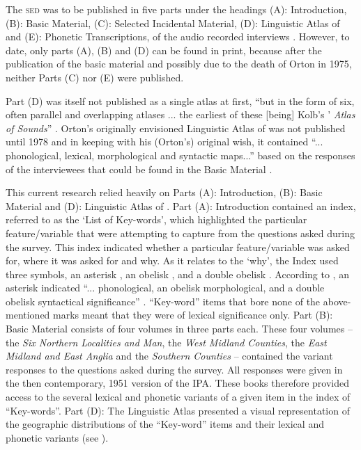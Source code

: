 The \textsc{sed} was to be published in five parts under the headings (A): Introduction, (B): Basic Material, (C): Selected Incidental Material, (D): Linguistic Atlas of  and (E): Phonetic Transcriptions, of the audio recorded interviews \citep{Orton62}. However, to date, only parts (A), (B) and (D) can be found in print, because after the publication of the basic material and possibly due to the death of Orton in 1975, neither Parts (C) nor (E) were published.

Part (D) was itself not published as a single atlas at first, ``but in the form of six, often parallel and overlapping atlases ... the earliest of these [being] Kolb's \citep{Kolb79}'  \emph{Atlas of  Sounds}'' \citep[12]{Fischer91}. Orton's originally envisioned Linguistic Atlas of  was not published until 1978 and in keeping with his (Orton's) original wish, it contained ``... phonological, lexical, morphological and syntactic maps...'' based on the responses of the interviewees that could be found in the Basic Material \citep[12]{Fischer91}.

This current research relied heavily on Parts (A): Introduction, (B): Basic Material and (D): Linguistic Atlas of . Part (A): Introduction contained an index, referred to as the `List of Key-words', which highlighted the particular feature/variable that \citet{Orton62} were attempting to capture from the questions asked during the survey. This index indicated whether a particular feature/variable was asked for, where it was asked for and why. As it relates to the `why', the Index used three symbols, an asterisk \textasteriskcentered, an obelisk \textdagger, and a double obelisk \textdaggerdbl. According to \citet{Orton62}, an asterisk indicated ``... phonological, an obelisk morphological, and a double obelisk syntactical significance'' \cite[47]{Orton62}. ``Key-word'' items that bore none of the above-mentioned marks meant that they were of lexical significance only. Part (B): Basic Material consists of four volumes in three parts each. These four volumes -- the \emph{Six Northern Localities and Man}, the \emph{West Midland Counties}, the \emph{East Midland  and East Anglia} and the \emph{Southern Counties} -- contained the variant responses to the questions asked during the survey. All responses were given in the then contemporary, 1951 version of the IPA. These books therefore provided access to the several lexical and phonetic variants of a given item in the index of ``Key-words''. Part (D): The Linguistic Atlas presented a visual representation of the geographic distributions of the ``Key-word'' items and their lexical and phonetic variants (see ).

